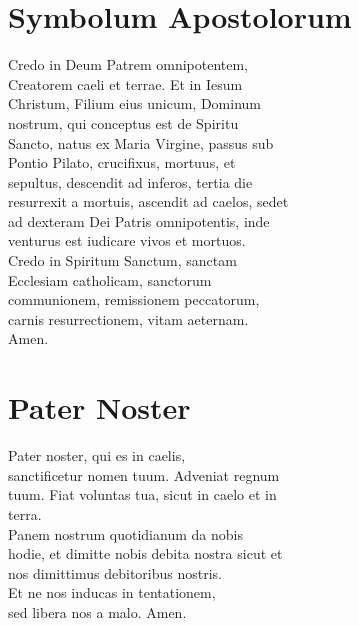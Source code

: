 \documentclass[paper=a5,pagesize=pdftex,fontsize=10pt,headinclude=on,twoside=off]{scrbook}
\begin{document}
\section{Symbolum Apostolorum}
\begin{scripture}
  \begin{poetry}
    Credo in Deum Patrem omnipotentem,\\
    Creatorem caeli et terrae. Et in Iesum\\
    Christum, Filium eius unicum, Dominum\\
    nostrum, qui conceptus est de Spiritu\\
    Sancto, natus ex Maria Virgine, passus sub\\
    Pontio Pilato, crucifixus, mortuus, et\\
    sepultus, descendit ad inferos, tertia die\\
    resurrexit a mortuis, ascendit ad caelos, sedet\\
    ad dexteram Dei Patris omnipotentis, inde\\
    venturus est iudicare vivos et mortuos.\\
    Credo in Spiritum Sanctum, sanctam\\
    Ecclesiam catholicam, sanctorum\\
    communionem, remissionem peccatorum,\\
    carnis resurrectionem, vitam aeternam.\\
    Amen.\\
  \end{poetry}
\end{scripture}

\section{Pater Noster}
\begin{scripture}
  \begin{poetry}
    Pater noster, qui es in caelis,\\
    sanctificetur nomen tuum. Adveniat regnum\\
    tuum. Fiat voluntas tua, sicut in caelo et in\\
    terra.\\
    Panem nostrum quotidianum da nobis\\
    hodie, et dimitte nobis debita nostra sicut et\\
    nos dimittimus debitoribus nostris.\\
    Et ne nos inducas in tentationem,\\
    sed libera nos a malo.
    Amen.\\
  \end{poetry}
\end{scripture}
\end{document}
